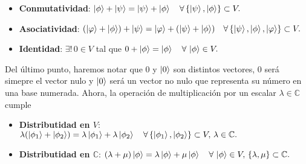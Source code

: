 \documentclass[letterpaper]{book}
\newcommand{\co}{\ensuremath{\mathbb C }}
\begin{document}
\begin{itemize}
    \item \textbf{Conmutatividad}: \(\ket{\phi} + \ket{\psi} = \ket{\psi} + \ket{\phi}\quad\forall\,\{\ket{\psi},\ket{\phi}\}\subset V.\)
    \item \textbf{Asociatividad}: \((\ket{\varphi}+\ket{\phi}) + \ket{\psi} = \ket{\varphi}+(\ket{\psi} + \ket{\phi})\quad\forall\,\{\ket{\psi},\ket{\phi},\ket{\varphi}\}\subset V.\)
    \item \textbf{Identidad}: \(\exists! \, 0 \in V\) tal que \(0 + \ket{\phi} = \ket{\phi}\quad\forall\,\ket{\phi}\in V.\)
\end{itemize}

Del último punto, haremos notar que $0$ y $\ket{0}$ son distintos vectores, $0$ será simepre el vector nulo y $\ket{0}$ será un vector no nulo que representa su número en una base numerada. Ahora, la operación de multiplicación por un escalar \(\lambda \in \co\) cumple

\begin{itemize}
    \item \textbf{Distributidad en \(V\)}: \(\lambda(\ket{\phi_1} + \ket{\phi_2}) = \lambda\ket{\phi_1} + \lambda\ket{\phi_2}\quad\forall\,\{\ket{\phi_1},\ket{\phi_2}\}\subset V,\,\lambda\in\co.\)
    \item \textbf{Distributidad en \(\co\)}: \((\lambda + \mu)\ket{\phi} = \lambda\ket{\phi} + \mu\ket{\phi}\quad\forall\,\ket{\phi}\in V,\,\{\lambda,\mu\}\subset\co.\)
\end{itemize}
\end{document}
